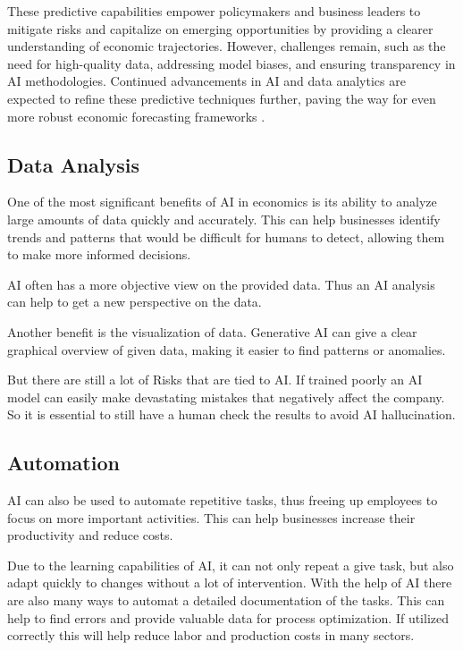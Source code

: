 These predictive capabilities empower policymakers and business leaders to mitigate risks and capitalize on emerging opportunities by providing a clearer understanding of economic trajectories. However, challenges remain, such as the need for high-quality data, addressing model biases, and ensuring transparency in AI methodologies. Continued advancements in AI and data analytics are expected to refine these predictive techniques further, paving the way for even more robust economic forecasting frameworks \cite{Predictive-Analysis-ai}.


\subsection{Data Analysis}
\label{subsec:data-analysis}

One of the most significant benefits of AI in economics is its ability to analyze large amounts of data quickly and accurately. 
This can help businesses identify trends and patterns that would be difficult for humans to detect, allowing them to make more informed decisions.

AI often has a more objective view on the provided data. Thus an AI analysis can help to get a new perspective on the data. 

Another benefit is the visualization of data. Generative AI can give a clear graphical overview of given data, making it easier to find patterns or anomalies. 

But there are still a lot of Risks that are tied to AI.
If trained poorly an AI model can easily make devastating mistakes that negatively affect the company.
So it is essential to still have a human check the results to avoid AI hallucination.

\cite{AiDataAnalysis}

\subsection{Automation}
\label{subsec:automation}

AI can also be used to automate repetitive tasks, thus freeing up employees to focus on more important activities.
This can help businesses increase their productivity and reduce costs.

Due to the learning capabilities of AI, it can not only repeat a give task, but also adapt quickly to changes without a lot of intervention.
With the help of AI there are also many ways to automat a detailed documentation of the tasks. This can help to find errors and provide valuable data for process optimization. 
If utilized correctly this will help reduce labor and production costs in many sectors. 

